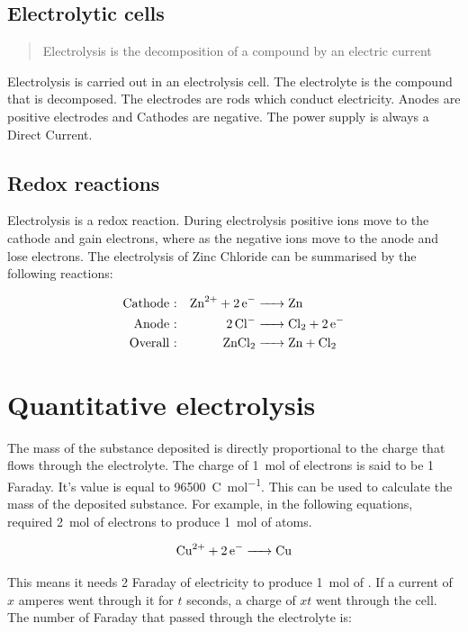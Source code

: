 \documentclass{scrbook}
\begin{document}
\subsection{Electrolytic cells}

	\begin{quote}
		Electrolysis is the decomposition of a compound by an electric current
	\end{quote}

	Electrolysis is carried out in an electrolysis cell. The electrolyte is the compound that is decomposed. The electrodes are rods which conduct electricity. Anodes are positive electrodes and Cathodes are negative. The power supply is always a Direct Current.

\subsection{Redox reactions}

	Electrolysis is a redox reaction. During electrolysis positive ions move to the cathode and gain electrons, where as the negative ions move to the anode and lose electrons. The electrolysis of Zinc Chloride can be summarised by the following reactions:

	\begin{align*}
		\text{Cathode :} && \ce{Zn^{2+} + 2e- &-> Zn} \\
		\text{Anode :} && \ce{2Cl- &-> Cl2 + 2e-} \\
		\text{Overall :} && \ce{ZnCl2 &-> Zn + Cl2}
	\end{align*}

\section{Quantitative electrolysis}

	The mass of the substance deposited is directly proportional to the charge that flows through the electrolyte. The charge of \SI{1}{\mole} of electrons is said to be 1 Faraday. It's value is equal to \SI{96500}{\coulomb\per\mole}. This can be used to calculate the mass of the deposited substance. For example, in the following equations,  required \SI{2}{\mole} of electrons to produce \SI{1}{\mole} of  atoms.

	\[ \ce{Cu^{2+} +2e- -> Cu} \]

	This means it needs 2 Faraday of electricity to produce \SI{1}{\mole} of . If a current of $x$ amperes went through it for $t$ seconds, a charge of $xt$ went through the cell. The number of Faraday that passed through the electrolyte is:
\end{document}
